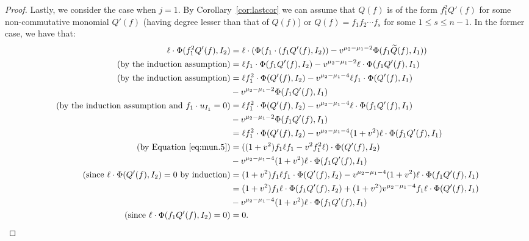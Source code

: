 \documentclass{amsart}
\numberwithin{equation}{section}
\theoremstyle{theorem}
\theoremstyle{definition}
\begin{document}
\begin{proof}
Lastly, we consider the case when $j=1$. By Corollary~\ref{cor:lastcor} we can assume that $Q(f)$ is of the form $f_1^2Q'(f)$ for some non-commutative monomial $Q'(f)$ (having degree lesser than that of $Q(f)$) or $Q(f)=f_1f_2\cdots f_s$ for some $1\leq s\leq n-1$. In the former case, we have that:
\begin{align*}
\ell\cdot \Phi(f_{1}^2 Q'(f),I_{2}) &= \ell\cdot(\Phi(f_1\cdot(f_1Q'(f),I_2))-v^{\mu_2-\mu_1-2}\Phi(f_1\widetilde{Q}(f),I_1))\\
\text{(by the induction assumption)}&=\ell f_1\cdot\Phi(f_1Q'(f), I_2) - v^{\mu_2-\mu_1-2}\ell\cdot\Phi(f_1Q'(f),I_1)\\
\text{(by the induction assumption)}&= \ell f_1^2\cdot\Phi(Q'(f), I_2) - v^{\mu_2-\mu_1-4}\ell f_1\cdot \Phi(Q'(f),I_1)\\
&- v^{\mu_2-\mu_1-2}\Phi(f_1Q'(f),I_1)\\
\text{(by the induction assumption and $f_1\cdot u_{I_1}=0$)}&= \ell f_1^2\cdot\Phi(Q'(f), I_2) - v^{\mu_2-\mu_1-4}\ell \cdot  \Phi(f_1Q'(f),I_1)\\
&- v^{\mu_2-\mu_1-2}\Phi(f_1Q'(f),I_1)\\
&=\ell f_1^2\cdot\Phi(Q'(f), I_2) - v^{\mu_2-\mu_1-4}(1+v^2)\ell \cdot  \Phi(f_1Q'(f),I_1)\\
\text{(by Equation~\eqref{eq:mun.5})}&=((1+v^2)f_1\ell f_1 - v^2f_1^2\ell)\cdot\Phi(Q'(f), I_2) \\
&- v^{\mu_2-\mu_1-4}(1+v^2)\ell \cdot  \Phi(f_1Q'(f),I_1)\\
\text{(since $\ell\cdot \Phi(Q'(f), I_2)=0$ by induction)}&=(1+v^2)f_1\ell f_1 \cdot\Phi(Q'(f), I_2) - v^{\mu_2-\mu_1-4}(1+v^2)\ell \cdot  \Phi(f_1Q'(f),I_1)\\
&=(1+v^2)f_1\ell \cdot \Phi(f_1Q'(f), I_2) + (1+v^2)v^{\mu_2-\mu_1-4}f_1\ell\cdot \Phi(Q'(f),I_1) \\
&- v^{\mu_2-\mu_1-4}(1+v^2)\ell \cdot  \Phi(f_1Q'(f),I_1)\\
\text{(since $\ell\cdot \Phi(f_1Q'(f), I_2)=0$)}&=0.
\end{align*}


\end{proof}
\end{document}
